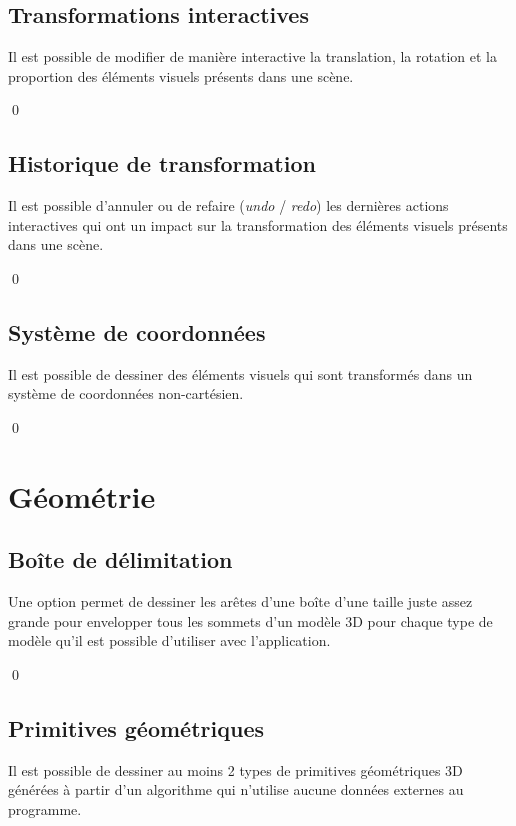 \documentclass[12pt]{article}
\newcommand{\state}{\noindent}
\begin{document}
\subsection{Transformations interactives}

\state
Il est possible de modifier de manière interactive la translation, la rotation
et la proportion des éléments visuels présents dans une scène.

\qed


\subsection{Historique de transformation}

\state
Il est possible d'annuler ou de refaire (\textit{undo} / \textit{redo}) les dernières actions interactives qui ont un impact sur la transformation des éléments visuels présents dans une scène.


\qed

\subsection{Système de coordonnées}

\state
Il est possible de dessiner des éléments visuels qui sont transformés dans un système de coordonnées non-cartésien.

\qed


\pagebreak

\section{Géométrie}

\subsection{Boîte de délimitation}

\state
Une option permet de dessiner les arêtes d'une boîte d'une taille juste assez grande pour envelopper tous les sommets d'un modèle 3D pour chaque type de modèle qu'il est possible d'utiliser avec l'application.

\qed

\subsection{Primitives géométriques}

\state
Il est possible de dessiner au moins 2 types de primitives géométriques 3D générées à partir d'un algorithme qui n'utilise aucune données externes au programme.
\end{document}
